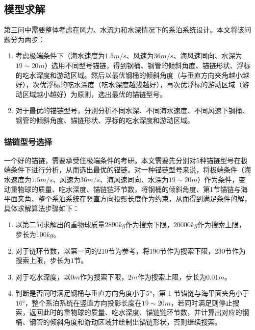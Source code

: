 \documentclass[withoutpreface,bwprint]{cumcmthesis} %
\begin{document}
\subsection{模型求解}
\par 第三问中需要整体考虑在风力、水流力和水深情况下的系泊系统设计。本文将该问题分为两步：
\begin{enumerate}
	\item 考虑极端条件下（海水速度为$1.5m/s$、风速为$36m/s$、海风速同向、水深为$19\sim 20m$）选用不同型号锚链，得到钢桶、钢管的倾斜角度、锚链形状、浮标的吃水深度和游动区域。然后以最优钢桶的倾斜角度（与垂直方向夹角越小越好），次优浮标的吃水深度（吃水深度越浅越好），再次优浮标的游动区域（游动区域越小越好）为原则，选出最优的锚链型号。
	\item 对于最优的锚链型号，分别分析不同水深、不同海水速度、不同风速下钢桶、钢管的倾斜角度、锚链形状、浮标的吃水深度和游动区域。
\end{enumerate}

\subsubsection{锚链型号选择}
一个好的锚链，需要承受住极端条件的考研。本文需要先分别对5种锚链型号在极端条件下进行分析，从而选出最优的锚链。对一种锚链型号来说，将极端条件（海水速度为$1.5m/s$、风速为$36m/s$、海风速同向、水深为$19\sim 20m$）作为条件，变动重物球的质量、吃水深度、锚链链环节数，将钢桶的倾斜角度、第1节锚链与海平面夹角、整个系泊系统在竖直方向投影长度作为约束，从而得到满足条件的解，具体求解算法步骤如下：
\begin{enumerate}
	\item 以第二问求解出的重物球质量$2890kg$作为搜索下限，$20000kg$作为搜索上限，步长为$100kg$。
	\item 对于链环节数，以第一问的$210$节为参考，将$190$节作为搜索下限，$230$节作为搜索上限，步长为$1$节。
	\item 对于吃水深度，以$0m$作为搜索下限，$2m$作为搜索上限，步长为$0.01m$。
	\item 判断是否同时满足钢桶与垂直方向角度小于$5°$，第 1 节锚链与海平面夹角小于$16°$，整个系泊系统在竖直方向投影长度在$19\sim 20m$，若同时满足则停止搜索，返回此时的重物球的质量、吃水深度、锚链链环节数，并计算出对应的钢桶、钢管的倾斜角度和游动区域并绘制出锚链形状，否则继续搜索。
\end{enumerate}
\end{document}
